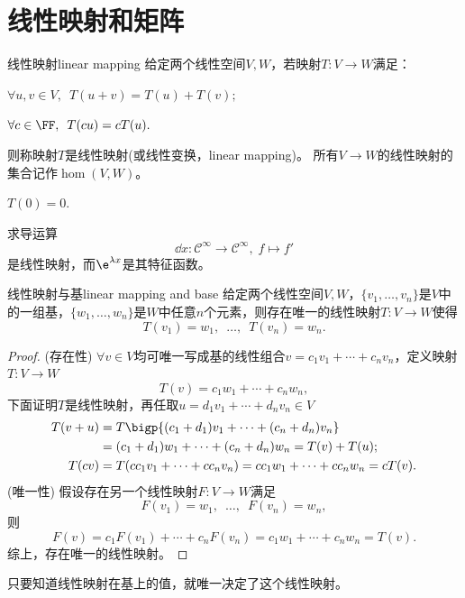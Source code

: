\section{线性映射和矩阵}
\begin{definition}{线性映射}{linear mapping}
	给定两个线性空间$V,W$，若映射$T:V\to W$满足：
	\begin{compactenum}
		\item $\forall u,v\in V,\enspace T(u+v)=T(u)+T(v);$
		\item $\forall c\in\FF,\enspace T(cu)=cT(u).$
	\end{compactenum}
	则称映射$T$是线性映射(或线性变换，linear mapping)。
	所有$V\to W$的线性映射的集合记作$\hom(V,W)$。
\end{definition}
\begin{corollary}
	$T(0)=0.$
\end{corollary}
\begin{example}
	{}{}
	求导运算
	\[
		\dd x:\mathcal C^\infty\to\mathcal C^\infty,\; f\mapsto f'
	\]
	是线性映射，而$\e^{\lambda x}$是其特征函数。
\end{example}
\begin{theorem}{线性映射与基}{linear mapping and base}
	给定两个线性空间$V,W$，$\{v_1,\ldots,v_n\}$是$V$中的一组基，$\{w_1,\ldots,w_n\}$是$W$中任意$n$个元素，则存在唯一的线性映射$T:V\to W$使得
	\[
		T(v_1)=w_1,\enspace\ldots,\enspace T(v_n)=w_n.
	\]
\end{theorem}
\begin{proof}
	(存在性) $\forall v\in V$均可唯一写成基的线性组合$v=c_1v_1+\cdots+c_nv_n$，定义映射$T:V\to W$
	\[
		T(v)=c_1w_1+\cdots+c_nw_n,
	\]
	下面证明$T$是线性映射，再任取$u=d_1v_1+\cdots+d_nv_n\in V$
	\begin{align*}
		T(v+u)&=T\bigp{(c_1+d_1)v_1+\cdots+(c_n+d_n)v_n}\\
		&=(c_1+d_1)w_1+\cdots+(c_n+d_n)w_n=T(v)+T(u);\\
		T(cv)&=T(cc_1v_1+\cdots+cc_nv_n)=cc_1w_1+\cdots+cc_nw_n=cT(v).
	\end{align*}
	(唯一性) 假设存在另一个线性映射$F:V\to W$满足
	\[
		F(v_1)=w_1,\enspace\ldots,\enspace F(v_n)=w_n,
	\]
	则 
	\[
		F(v)=c_1F(v_1)+\cdots+c_nF(v_n)=c_1w_1+\cdots+c_nw_n=T(v).
	\]
	综上，存在唯一的线性映射。
\end{proof}

\begin{remark}
	只要知道线性映射在基上的值，就唯一决定了这个线性映射。
\end{remark}

